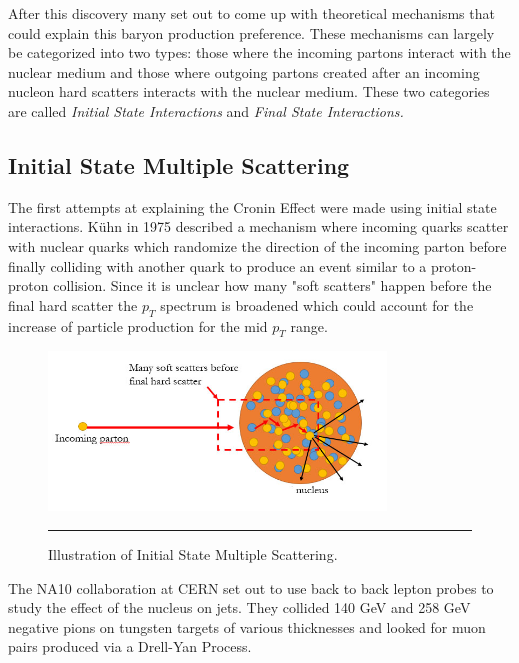 After this discovery many set out to come up with theoretical mechanisms that could explain this baryon production preference. These mechanisms can largely be categorized into two types: those where the incoming partons interact with the nuclear medium and those where outgoing partons created after an incoming nucleon hard scatters interacts with the nuclear medium. These two categories are called \textit{Initial State Interactions} and \textit{Final State Interactions.}

\subsection{Initial State Multiple Scattering}
The first attempts at explaining the Cronin Effect were made using initial state interactions. Kühn in 1975 described a mechanism where incoming quarks scatter with nuclear quarks which randomize the direction of the incoming parton before finally colliding with another quark to produce an event similar to a proton-proton collision\citep{PhysRevD.13.2948}. Since it is unclear how many "soft scatters" happen before the final hard scatter the $p_{T}$ spectrum is broadened which could account for the increase of particle production for the mid $p_{T}$ range. 
\begin{figure}[htbp!]
  \centering
    \includegraphics[width=0.8\textwidth]{Figures/ISIscattering.jpg}
    \rule{35em}{0.5pt}
  \caption[Illustration of Initial State Multiple Scattering]{Illustration of Initial State Multiple Scattering.}
  \label{fig:ISIscattering}
\end{figure} 

The NA10 collaboration at CERN set out to use back to back lepton probes to study the effect of the nucleus on jets. They collided 140 GeV and 258 GeV negative pions on tungsten targets of various thicknesses and looked for muon pairs produced via a Drell-Yan Process. 

